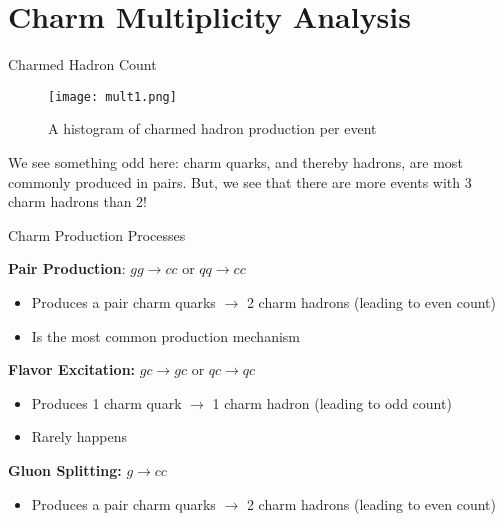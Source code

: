 \documentclass[10pt]{beamer}
\begin{document}
\section{Charm Multiplicity Analysis}

\begin{frame}{Charmed Hadron Count}

\begin{figure}
    \centering
    \texttt{[image: mult1.png]}
    \caption{A histogram of charmed hadron production per event}
    \label{fig:mult1}
\end{figure}

We see something odd here: charm quarks, and thereby hadrons, are most commonly produced in pairs. But, we see that there are more events with 3 charm hadrons than 2!
    
\end{frame}

\begin{frame}{Charm Production Processes}

\textbf{Pair Production}: $gg \rightarrow cc$ or $qq \rightarrow cc$
\begin{itemize}
    \item Produces a pair charm quarks $\rightarrow$ 2 charm hadrons (leading to even count)
    \item Is the most common production mechanism
\end{itemize}

\textbf{Flavor Excitation:} $gc \rightarrow gc$ or $qc \rightarrow qc$
\begin{itemize}
    \item Produces 1 charm quark $\rightarrow$ 1 charm hadron (leading to odd count)
    \item Rarely happens
\end{itemize}

\textbf{Gluon Splitting:} $g \rightarrow cc$
\begin{itemize}
    \item Produces a pair charm quarks $\rightarrow$ 2 charm hadrons (leading to even count)
\end{itemize}

\end{frame}
\end{document}
